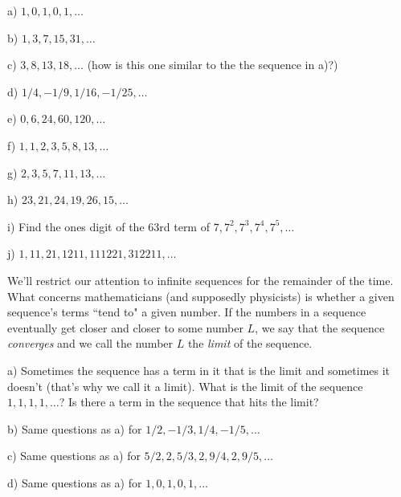 \documentclass[12pt]{article}
\newcommand{\numb}[1]{\noindent{\bf #1)}}
\begin{document}
\bigskip

a) $1,0,1,0,1,\dots$

\bigskip

b) $1,3,7,15,31,\dots$

\bigskip

c) $3,8,13,18,\dots$ (how is this one similar to the the sequence in a)?)

\bigskip 

d) $1/4,-1/9,1/16,-1/25,\dots$

\bigskip

e) $0,6,24,60,120,\dots$

\bigskip

f) $1,1,2,3,5,8,13,\dots$

\bigskip

g) $2,3,5,7,11,13,\dots$

\bigskip

h) $23,21,24,19,26,15,\dots$ 

\bigskip

i) Find the ones digit of the 63rd term of $7,7^2,7^3,7^4,7^5,\dots$

\bigskip

j) $1,11,21,1211,111221,312211,\dots$

\newpage


\numb{4} We'll restrict our attention to infinite sequences for the remainder of the time. What concerns mathematicians (and supposedly physicists) is whether a given sequence's terms ``tend to" a given number. If the numbers in a sequence eventually get closer and closer to some number $L$, we say that the sequence \textit{converges} and we call the number $L$ the \textit{limit} of the sequence. 

\bigskip

a) Sometimes the sequence has a term in it that is the limit and sometimes it doesn't (that's why we call it a limit). What is the limit of the sequence $1,1,1,1,\dots $? Is there a term in the sequence that hits the limit?

\bigskip

b) Same questions as a) for $1/2,-1/3,1/4,-1/5,\dots$

\bigskip

c) Same questions as a) for $5/2,2,5/3,2,9/4,2,9/5,\dots$

\bigskip

d) Same questions as a) for $1,0,1,0,1,\dots$
\end{document}
